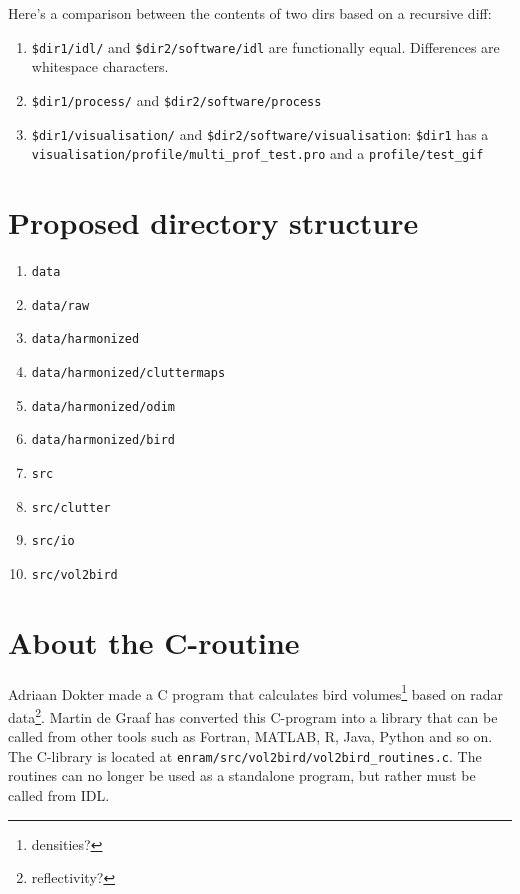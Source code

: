 Here's a comparison between the contents of two dirs based on a recursive diff:



\begin{enumerate}
\item{\texttt{\$dir1/idl/} and \texttt{\$dir2/software/idl} are functionally equal. Differences are whitespace characters.}
\item{\texttt{\$dir1/process/} and \texttt{\$dir2/software/process}}
\item{\texttt{\$dir1/visualisation/} and \texttt{\$dir2/software/visualisation}: \texttt{\$dir1} has a \texttt{visualisation/profile/multi\_prof\_test.pro} and a \texttt{profile/test\_gif}}
\end{enumerate}





\section{Proposed directory structure}

\begin{enumerate}
\item{\texttt{data}}
\item{\texttt{data/raw}}
\item{\texttt{data/harmonized}}
\item{\texttt{data/harmonized/cluttermaps}}
\item{\texttt{data/harmonized/odim}}
\item{\texttt{data/harmonized/bird}}
\item{\texttt{src}}
\item{\texttt{src/clutter}}
\item{\texttt{src/io}}
\item{\texttt{src/vol2bird}}
\end{enumerate}



\section{About the C-routine}

Adriaan Dokter made a C program that calculates bird volumes\footnote{densities?} based on radar data\footnote{reflectivity?}. Martin de Graaf has converted this C-program into a library that can be called from other tools such as Fortran, MATLAB, R, Java, Python and so on. The C-library is located at \texttt{enram/src/vol2bird/vol2bird\_routines.c}. The routines can no longer be used as a standalone program, but rather must be called from IDL.

